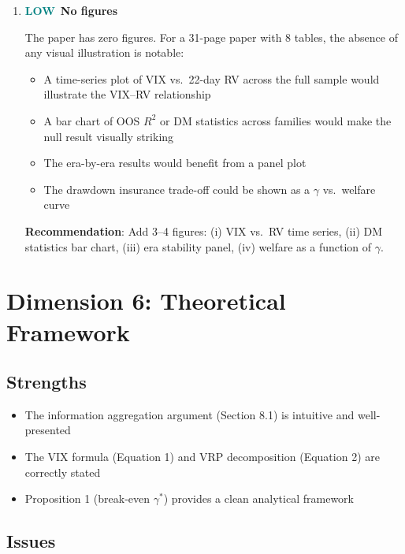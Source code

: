 \documentclass[12pt,a4paper]{article}
\newcommand{\LOW}{\textcolor{teal}{\textbf{LOW}}}
\begin{document}
\begin{enumerate}[label=D5.\arabic*]
\textbf{Recommendation}: Add a footnote to Table 4 explicitly noting the different sample period and cautioning against cross-table comparison.

\item \LOW\ \textbf{No figures}

The paper has zero figures. For a 31-page paper with 8 tables, the absence of any visual illustration is notable:
\begin{itemize}
    \item A time-series plot of VIX vs.\ 22-day RV across the full sample would illustrate the VIX--RV relationship
    \item A bar chart of OOS $R^2$ or DM statistics across families would make the null result visually striking
    \item The era-by-era results would benefit from a panel plot
    \item The drawdown insurance trade-off could be shown as a $\gamma$ vs.\ welfare curve
\end{itemize}
\textbf{Recommendation}: Add 3--4 figures: (i) VIX vs.\ RV time series, (ii) DM statistics bar chart, (iii) era stability panel, (iv) welfare as a function of $\gamma$.

\end{enumerate}


\section{Dimension 6: Theoretical Framework}
\label{sec:d6}

\subsection*{Strengths}
\begin{itemize}
    \item The information aggregation argument (Section 8.1) is intuitive and well-presented
    \item The VIX formula (Equation 1) and VRP decomposition (Equation 2) are correctly stated
    \item Proposition 1 (break-even $\gamma^*$) provides a clean analytical framework
\end{itemize}

\subsection*{Issues}
\end{document}
